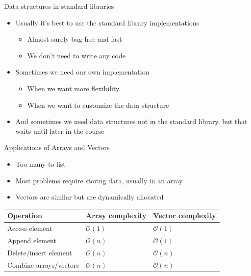 \documentclass{beamer}
\begin{document}
\begin{frame}[plain]{Data structures in standard libraries}
    \begin{itemize}
        \item Usually it's best to use the standard library implementations
        \begin{itemize}
            \item Almost surely bug-free and fast
            \item We don't need to write any code
        \end{itemize}
        \item Sometimes we need our own implementation
        \begin{itemize}
            \item When we want more flexibility
            \item When we want to customize the data structure
        \end{itemize}
        \item And sometimes we need data structures not in the standard library, but that waits until later in the course
    \end{itemize}
\end{frame}

\begin{frame}[plain]{Applications of Arrays and Vectors}
    \begin{itemize}
        \item Too many to list
        \item Most problems require storing data, usually in an array
        \item Vectors are similar but are dynamically allocated
    \end{itemize}
    \vspace*{1cm}
    \begin{center}
    \begin{tabular}{l|l|l}
    Operation & Array complexity & Vector complexity \\ \hline
    Access element & $\mathcal{O}(1)$ & $\mathcal{O}(1)$ \\
    Append element & $\mathcal{O}(n)$ & $\mathcal{O}(1)$ \\
    Delete/insert element & $\mathcal{O}(n)$ & $\mathcal{O}(n)$ \\
    Combine arrays/vectors & $\mathcal{O}(n)$ & $\mathcal{O}(n)$ \\
    \end{tabular}
    \end{center}
\end{frame}
\end{document}
